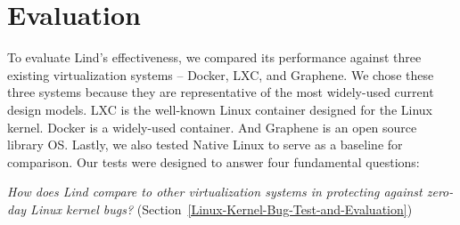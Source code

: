 \section{Evaluation}
\label{sec.evaluation}

To evaluate Lind's effectiveness,
we compared its performance against three existing
virtualization systems -- Docker, LXC, and Graphene.
We chose these three systems because they are representative of the most
widely-used current design models. 
LXC is the well-known Linux container designed for the Linux kernel. 
Docker is a widely-used container. 
And Graphene is an open source library OS. 
Lastly, we also tested Native Linux to serve as a
baseline for comparison.
%
Our tests were designed to answer four fundamental questions:

\textit{How does Lind compare to other virtualization systems
in protecting against zero-day Linux kernel bugs?}
(Section~{\ref{Linux-Kernel-Bug-Test-and-Evaluation}})

